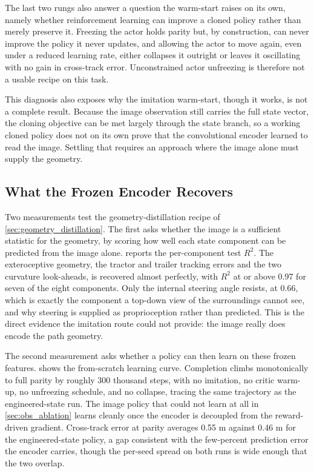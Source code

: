 The last two rungs also answer a question the warm-start raises on its own, namely whether reinforcement learning can improve a cloned policy rather than merely preserve it. Freezing the actor holds parity but, by construction, can never improve the policy it never updates, and allowing the actor to move again, even under a reduced learning rate, either collapses it outright or leaves it oscillating with no gain in cross-track error. Unconstrained actor unfreezing is therefore not a usable recipe on this task.

This diagnosis also exposes why the imitation warm-start, though it works, is not a complete result. Because the image observation still carries the full state vector, the cloning objective can be met largely through the state branch, so a working cloned policy does not on its own prove that the convolutional encoder learned to read the image. Settling that requires an approach where the image alone must supply the geometry.

\subsection{What the Frozen Encoder Recovers}
\label{sec:geometry_encoder}

Two measurements test the geometry-distillation recipe of \cref{sec:geometry_distillation}. The first asks whether the image is a sufficient statistic for the geometry, by scoring how well each state component can be predicted from the image alone.  reports the per-component test $R^2$. The exteroceptive geometry, the tractor and trailer tracking errors and the two curvature look-aheads, is recovered almost perfectly, with $R^2$ at or above 0.97 for seven of the eight components. Only the internal steering angle resists, at 0.66, which is exactly the component a top-down view of the surroundings cannot see, and why steering is supplied as proprioception rather than predicted. This is the direct evidence the imitation route could not provide: the image really does encode the path geometry.



The second measurement asks whether a policy can then learn on these frozen features.  shows the from-scratch learning curve. Completion climbs monotonically to full parity by roughly 300 thousand steps, with no imitation, no critic warm-up, no unfreezing schedule, and no collapse, tracing the same trajectory as the engineered-state run. The image policy that could not learn at all in \cref{sec:obs_ablation} learns cleanly once the encoder is decoupled from the reward-driven gradient. Cross-track error at parity averages 0.55 m against 0.46 m for the engineered-state policy, a gap consistent with the few-percent prediction error the encoder carries, though the per-seed spread on both runs is wide enough that the two overlap.

